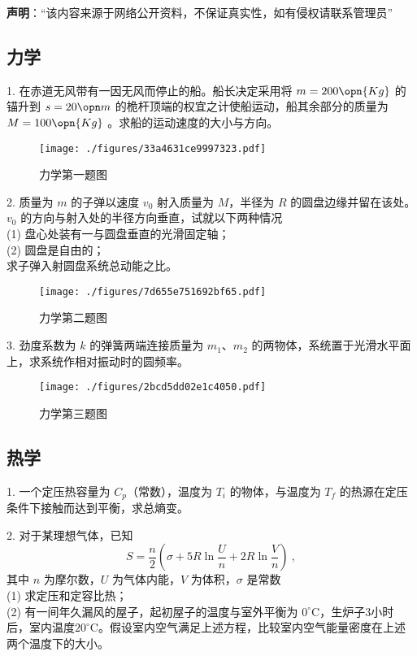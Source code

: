 
\textbf{声明}：“该内容来源于网络公开资料，不保证真实性，如有侵权请联系管理员”

\subsection{力学}
1. 在赤道无风带有一因无风而停止的船。船长决定采用将 $m=200\opn{Kg}$ 的锚升到 $s=20\opn m$ 的桅杆顶端的权宜之计使船运动，船其余部分的质量为 $M=100 \opn{Kg}$ 。求船的运动速度的大小与方向。
\begin{figure}[ht]
\centering
\texttt{[image: ./figures/33a4631ce9997323.pdf]}
\caption{力学第一题图} \label{fig_NJU12_1}
\end{figure}
2. 质量为 $m$ 的子弹以速度 $v_0$ 射入质量为 $M$，半径为 $R$ 的圆盘边缘并留在该处。$v_0$ 的方向与射入处的半径方向垂直，试就以下两种情况\\
(1) 盘心处装有一与圆盘垂直的光滑固定轴；\\
(2) 圆盘是自由的；\\
求子弹入射圆盘系统总动能之比。
\begin{figure}[ht]
\centering
\texttt{[image: ./figures/7d655e751692bf65.pdf]}
\caption{力学第二题图} \label{fig_NJU12_2}
\end{figure}
3. 劲度系数为 $k$ 的弹簧两端连接质量为 $m_1$、$m_2$ 的两物体，系统置于光滑水平面上，求系统作相对振动时的圆频率。
\begin{figure}[ht]
\centering
\texttt{[image: ./figures/2bcd5dd02e1c4050.pdf]}
\caption{力学第三题图} \label{fig_NJU12_3}
\end{figure}
\subsection{热学}
1. 一个定压热容量为 $C_p$（常数），温度为 $T_i$ 的物体，与温度为 $T_f$ 的热源在定压条件下接触而达到平衡，求总熵变。

2. 对于某理想气体，已知
\begin{equation}
S=\frac n2 (\sigma+5R\ln{\frac Un}+2R\ln{\frac Vn})~,
\end{equation}
其中 $n$ 为摩尔数，$U$ 为气体内能，$V$ 为体积，$\sigma$ 是常数\\
(1) 求定压和定容比热；\\
(2) 有一间年久漏风的屋子，起初屋子的温度与室外平衡为 $0^\circ\mathrm{C}$，生炉子3小时后，室内温度$20^\circ\mathrm{C}$。假设室内空气满足上述方程，比较室内空气能量密度在上述两个温度下的大小。

